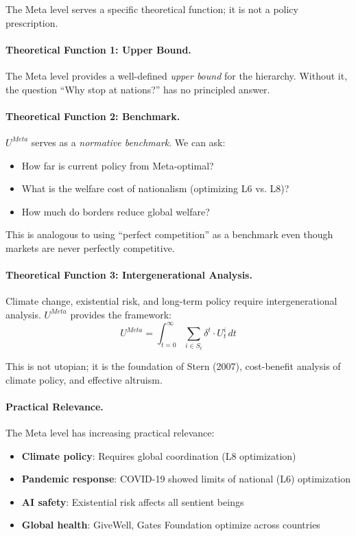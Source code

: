 \documentclass[12pt,a4paper]{article}
\begin{document}
The Meta level serves a specific theoretical function; it is not a policy 
prescription.

\paragraph{Theoretical Function 1: Upper Bound.}

The Meta level provides a well-defined \textit{upper bound} for the hierarchy. 
Without it, the question ``Why stop at nations?'' has no principled answer.

\paragraph{Theoretical Function 2: Benchmark.}

$U^{Meta}$ serves as a \textit{normative benchmark}. We can ask:
\begin{itemize}[nosep]
\item How far is current policy from Meta-optimal?
\item What is the welfare cost of nationalism (optimizing L6 vs. L8)?
\item How much do borders reduce global welfare?
\end{itemize}

This is analogous to using ``perfect competition'' as a benchmark even though 
markets are never perfectly competitive.

\paragraph{Theoretical Function 3: Intergenerational Analysis.}

Climate change, existential risk, and long-term policy require intergenerational 
analysis. $U^{Meta}$ provides the framework:
\begin{equation}
U^{Meta} = \int_{t=0}^{\infty} \sum_{i \in S_t} \delta^t \cdot U^i_t \, dt
\end{equation}

This is not utopian; it is the foundation of Stern (2007), cost-benefit 
analysis of climate policy, and effective altruism.

\paragraph{Practical Relevance.}

The Meta level has increasing practical relevance:
\begin{itemize}[nosep]
\item \textbf{Climate policy}: Requires global coordination (L8 optimization)
\item \textbf{Pandemic response}: COVID-19 showed limits of national (L6) optimization
\item \textbf{AI safety}: Existential risk affects all sentient beings
\item \textbf{Global health}: GiveWell, Gates Foundation optimize across countries
\end{itemize}
\end{document}
